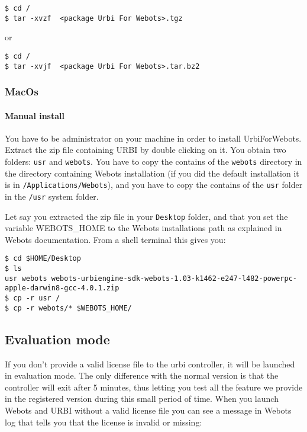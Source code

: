 \begin{lstlisting}[firstnumber=1,]
$ cd /
$ tar -xvzf  <package Urbi For Webots>.tgz
\end{lstlisting}
     or

\begin{lstlisting}[firstnumber=1,]
$ cd /
$ tar -xvjf  <package Urbi For Webots>.tar.bz2
\end{lstlisting}

\subsubsection{MacOs}
\label{webots.setup.macos}%

\paragraph{Manual install}
\label{webots.setup.macos.manual}%

You have to be administrator on your machine in order to install
UrbiForWebots.  Extract the zip file containing URBI by double
clicking on it.  You obtain two folders: \nolinkurl{usr} and
\nolinkurl{webots}.  You have to copy the contains of the
\nolinkurl{webots} directory in the directory containing Webots
installation (if you did the default installation it is in
\nolinkurl{/Applications/Webots}), and you have to copy the contains
of the \nolinkurl{usr} folder in the \nolinkurl{/usr} system folder.


Let say you extracted the zip file in your \nolinkurl{Desktop} folder,
and that you set the variable WEBOTS\_HOME to the Webots installations
path as explained in Webots documentation.  From a shell terminal this
gives you:


\begin{lstlisting}[firstnumber=1,]
$ cd $HOME/Desktop
$ ls
usr webots webots-urbiengine-sdk-webots-1.03-k1462-e247-l482-powerpc-apple-darwin8-gcc-4.0.1.zip
$ cp -r usr /
$ cp -r webots/* $WEBOTS_HOME/
\end{lstlisting}

\subsection{Evaluation mode}
\label{webots.evaluation}%

If you don't provide a valid license file to the urbi controller, it
will be launched in evaluation mode. The only difference with the
normal version is that the controller will exit after 5 minutes, thus
letting you test all the feature we provide in the registered version
during this small period of time. When you launch Webots and URBI
without a valid license file you can see a message in Webots log that
tells you that the license is invalid or missing:


